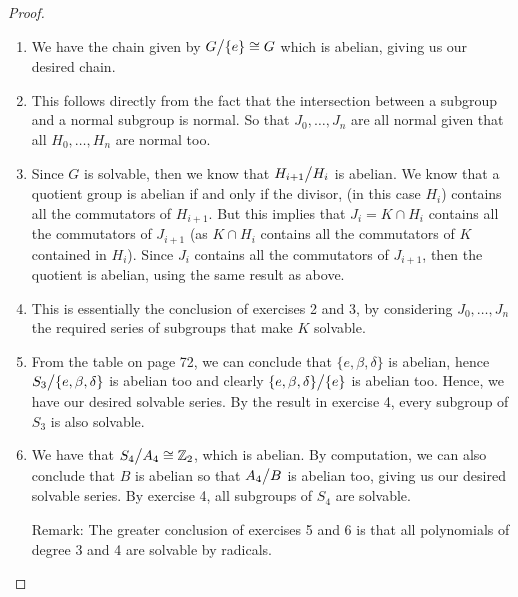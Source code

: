 \begin{proof}
 \begin{enumerate}
     \item We have the chain given by ${\textstyle G}\big/{\textstyle \{e\}}\cong G$ which is abelian, giving us our desired chain.
     \item This follows directly from the fact that the intersection between a subgroup and a normal subgroup is normal. So that $J_0,\dots,J_{n}$ are all normal given that all $H_0,\dots,H_{n}$ are normal too.
     \item Since $G$ is solvable, then we know that ${\textstyle H_{i+1}}\big/{\textstyle H_i}$ is abelian. We know that a quotient group is abelian if and only if  the divisor, (in this case $H_i$) contains all the commutators of $H_{i+1}$. But this implies that $J_i=K\cap H_i$ contains all the commutators of $J_{i+1}$ (as $K\cap H_i$ contains all the commutators of $K$ contained in $H_i$). Since $J_{i}$ contains all the commutators of $J_{i+1}$, then the quotient is abelian, using the same result as above.
     \item This is essentially the conclusion of exercises 2 and 3, by considering $J_0,\dots,J_n$ the required series of subgroups that make $K$ solvable.
     \item From the table on page 72, we can conclude that $\{e,\beta,\delta\}$ is abelian, hence ${\textstyle S_3}\big/{\textstyle \{e,\beta,\delta\}}$ is abelian too and clearly ${\textstyle \{e,\beta,\delta\}}\big/{\textstyle \{e\}}$ is abelian too. Hence, we have our desired solvable series. By the result in exercise 4, every subgroup of $S_3$ is also solvable.
     \item We have that ${\textstyle S_4}\big/{\textstyle A_4}\cong \mathbb{Z}_2$, which is abelian. By computation, we can also conclude that $B$ is abelian so that ${\textstyle A_4}\big/{\textstyle B}$ is abelian too, giving us our desired solvable series. By exercise 4, all subgroups of $S_4$ are solvable.

     Remark: The greater conclusion of exercises 5 and 6 is that all polynomials of degree 3 and 4 are solvable by radicals.
 \end{enumerate}
\end{proof}